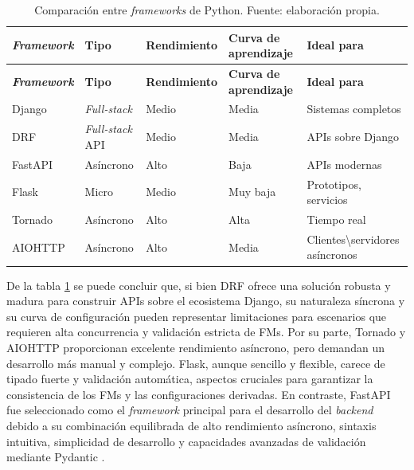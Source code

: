 \begin{longtable}{|p{3cm}|p{2.5cm}|p{2cm}|p{2.5cm}|p{3cm}|}
	\caption[Comparación entre \textit{frameworks} de Python]{Comparación entre \textit{frameworks} de Python. Fuente: elaboración propia.} 
    \label{tab:frameworks} \\
    
    \hline
    \rowcolor[HTML]{CBCEFB} 
    \textbf{\textit{Framework}} & \textbf{Tipo} & \textbf{Rendimiento} & \textbf{Curva de aprendizaje} & \textbf{Ideal para} \\
    \hline
    \endfirsthead
    	
    \hline
    \rowcolor[HTML]{CBCEFB} 
    \textbf{\textit{Framework}} & \textbf{Tipo} & \textbf{Rendimiento} & \textbf{Curva de aprendizaje} & \textbf{Ideal para} \\
    \hline
    \endhead
    	
    Django & \textit{Full-stack} & Medio & Media & Sistemas completos \\ 
    \hline
    \rowcolor[HTML]{EDEBF1}
    \ac{DRF} & \textit{Full-stack} \ac{API} & Medio & Media & \ac{API}s sobre Django \\ 
    \hline
    FastAPI & Asíncrono & Alto & Baja & \ac{API}s modernas \\ 
    \hline
    \rowcolor[HTML]{EDEBF1}
    Flask & Micro & Medio & Muy baja & Prototipos, servicios \\ 
    \hline
    Tornado & Asíncrono & Alto & Alta & Tiempo real \\
    \hline
    \rowcolor[HTML]{EDEBF1}
    AIOHTTP & Asíncrono & Alto & Media & Clientes\textbackslash servidores asíncronos \\ 
    \hline
    
\end{longtable}

De la tabla \ref{tab:frameworks} se puede concluir que, si bien \ac{DRF} ofrece una solución robusta y madura para construir \ac{API}s sobre el ecosistema 
Django, su naturaleza síncrona y su curva de configuración pueden representar limitaciones para escenarios 
que requieren alta concurrencia y validación estricta de \ac{FM}s. Por su parte, 
Tornado y AIOHTTP proporcionan excelente rendimiento asíncrono, pero demandan un desarrollo más manual y 
complejo. Flask, aunque sencillo y flexible, carece de tipado fuerte y validación automática, aspectos 
cruciales para garantizar la consistencia de los \ac{FM}s y las configuraciones derivadas. 
En contraste, FastAPI fue seleccionado como el \textit{framework} principal para el desarrollo del \textit{backend} debido a 
su combinación equilibrada de alto rendimiento asíncrono, sintaxis intuitiva, simplicidad de desarrollo y capacidades avanzadas de 
validación mediante Pydantic \citep{ramirez2021fastapi}. 

